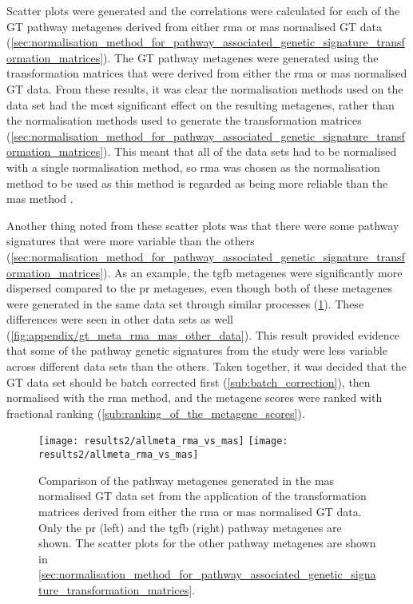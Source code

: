 Scatter plots were generated and the correlations were calculated for each of the GT pathway metagenes derived from either \gls{rma} or \gls{mas} normalised GT data (\cref{sec:normalisation_method_for_pathway_associated_genetic_signature_transformation_matrices}).
The GT pathway metagenes were generated using the transformation matrices that were derived from either the \gls{rma} or \gls{mas} normalised GT data.
From these results, it was clear the normalisation methods used on the data set had the most significant effect on the resulting metagenes, rather than the normalisation methods used to generate the transformation matrices (\cref{sec:normalisation_method_for_pathway_associated_genetic_signature_transformation_matrices}).
This meant that all of the data sets had to be normalised with a single normalisation method, so \gls{rma} was chosen as the normalisation method to be used as this method is regarded as being more reliable than the \gls{mas} method \citep{Irizarry2003}.

Another thing noted from these scatter plots was that there were some pathway signatures that were more variable than the others (\cref{sec:normalisation_method_for_pathway_associated_genetic_signature_transformation_matrices}).
As an example, the \gls{tgfb} metagenes were significantly more dispersed compared to the \gls{pr} metagenes, even though both of these metagenes were generated in the same data set through similar processes (\cref{fig:gt_rma_vs_mas}).
These differences were seen in other data sets as well (\cref{fig:appendix/gt_meta_rma_mas_other_data}).
This result provided evidence that some of the pathway genetic signatures from the \citet{Gatza2010a} study were less variable across different data sets than the others.
Taken together, it was decided that the GT data set should be batch corrected first (\cref{sub:batch_correction}), then normalised with the \gls{rma} method, and the metagene scores were ranked with fractional ranking (\cref{sub:ranking_of_the_metagene_scores}).

\begin{figure}[htpb]
	\centering
	\texttt{[image: results2/allmeta\_rma\_vs\_mas]}
	\texttt{[image: results2/allmeta\_rma\_vs\_mas]}
	\caption[Comparison of the pathway metagenes generated in the \acrshort{mas} normalised GT data set from the application of the transformation matrices derived from either the \acrshort{rma} or \acrshort{mas} normalised GT data]{Comparison of the pathway metagenes generated in the \acrshort{mas} normalised GT data set from the application of the transformation matrices derived from either the \acrshort{rma} or \acrshort{mas} normalised GT data.
	Only the \gls{pr} (left) and the \gls{tgfb}  (right) pathway metagenes are shown.
	The scatter plots for the other pathway metagenes are shown in \cref{sec:normalisation_method_for_pathway_associated_genetic_signature_transformation_matrices}.
	}
	\label{fig:gt_rma_vs_mas}
\end{figure}

